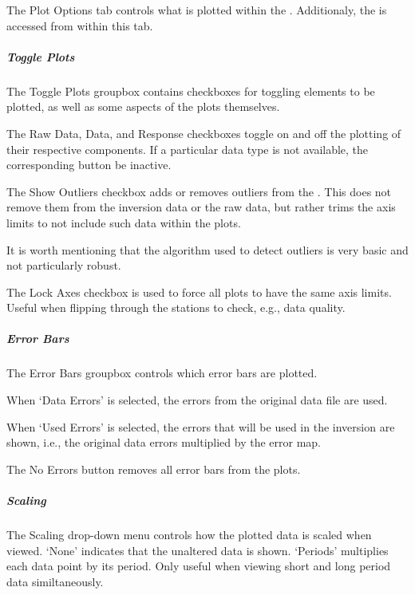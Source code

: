 \documentclass[letterpaper,10pt,english]{sphinxmanual}
\begin{document}
The Plot Options tab controls what is plotted within the {\hyperref[\detokenize{content/data_plot/main_window:plot-window}]{}}. Additionaly, the {\hyperref[\detokenize{content/data_plot/map_viewer:map-viewer}]{}} is accessed from within this tab.


\subparagraph{Toggle Plots}
\label{\detokenize{content/data_plot/main_window:toggle-plots}}
The Toggle Plots groupbox contains checkboxes for toggling elements to be plotted, as well as some aspects of the plots themselves.

The Raw Data, Data, and Response checkboxes toggle on and off the plotting of their respective components. If a particular data type is not available, the corresponding button  be inactive.

The Show Outliers checkbox adds or removes outliers from the {\hyperref[\detokenize{content/data_plot/main_window:plot-window}]{}}. This does not remove them from the inversion data or the raw data, but rather trims the axis limits to not include such data within the plots.

It is worth mentioning that the algorithm used to detect outliers is very basic and not particularly robust.

The Lock Axes checkbox is used to force all plots to have the same axis limits. Useful when flipping through the stations to check, e.g., data quality.


\subparagraph{Error Bars}
\label{\detokenize{content/data_plot/main_window:error-bars}}
The Error Bars groupbox controls which error bars are plotted.

When ‘Data Errors’ is selected, the errors from the original data file are used.

When ‘Used Errors’ is selected, the errors that will be used in the inversion are shown, i.e., the original data errors multiplied by the error map.

The No Errors button removes all error bars from the plots.


\subparagraph{Scaling}
\label{\detokenize{content/data_plot/main_window:scaling}}\label{\detokenize{content/data_plot/main_window:id4}}
The Scaling drop-down menu controls how the plotted data is scaled when viewed.
‘None’ indicates that the unaltered data is shown.
‘Periods’ multiplies each data point by its period. Only useful when viewing short and long period data similtaneously.
\end{document}
